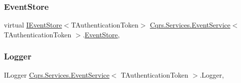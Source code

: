 \subsubsection{\texorpdfstring{Event\+Store}{EventStore}}
{\footnotesize\ttfamily virtual \hyperlink{interfaceCqrs_1_1Events_1_1IEventStore}{I\+Event\+Store}$<$T\+Authentication\+Token$>$ \hyperlink{classCqrs_1_1Services_1_1EventService}{Cqrs.\+Services.\+Event\+Service}$<$ T\+Authentication\+Token $>$.\hyperlink{classCqrs_1_1Events_1_1EventStore}{Event\+Store}\hspace{0.3cm}{\ttfamily [get]}, {\ttfamily [protected]}}

\mbox{\label{classCqrs_1_1Services_1_1EventService_acd30fea6829b27ee802126c36f8875b4_acd30fea6829b27ee802126c36f8875b4}} 
\subsubsection{\texorpdfstring{Logger}{Logger}}
{\footnotesize\ttfamily I\+Logger \hyperlink{classCqrs_1_1Services_1_1EventService}{Cqrs.\+Services.\+Event\+Service}$<$ T\+Authentication\+Token $>$.Logger\hspace{0.3cm}{\ttfamily [get]}, {\ttfamily [protected]}}

